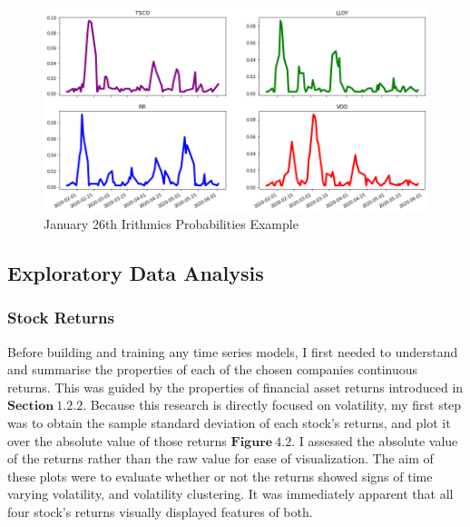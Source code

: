 \begin{figure}[H]
\centering
\includegraphics[scale = 0.45]{images/irithmicsprobs.png}
\caption{January 26th Irithmics Probabilities Example}
\label{fig: Irithmics Plot}
\end{figure}

\subsection{Exploratory Data Analysis}
\subsubsection{Stock Returns}


Before building and training any time series models, I first needed to understand and summarise the properties of each of the chosen companies continuous returns. This was guided by the properties of financial asset returns introduced in $\mathbf{Section~1.2.2}$. Because this research is directly focused on volatility, my first step was to obtain the sample standard deviation of each stock's returns, and plot it over the absolute value of those returns $\mathbf{Figure~4.2}$. I assessed the absolute value of the returns rather than the raw value for ease of visualization. The aim of these plots were to evaluate whether or not the returns showed signs of time varying volatility, and volatility clustering. It was immediately apparent that all four stock's returns visually displayed features of both. 


